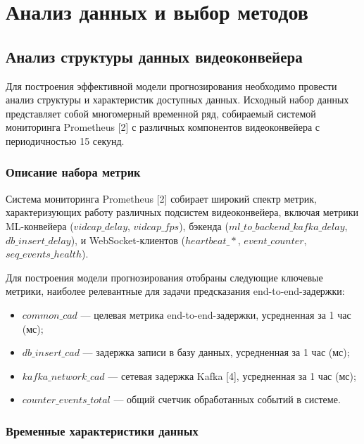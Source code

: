 \chapter{Анализ данных и выбор методов}

\section{Анализ структуры данных видеоконвейера}

\hspace*{1.25cm}Для построения эффективной модели прогнозирования необходимо провести анализ структуры и характеристик доступных данных. Исходный набор данных представляет собой многомерный временной ряд, собираемый системой мониторинга Prometheus [2] с различных компонентов видеоконвейера с периодичностью 15 секунд.

\subsection{Описание набора метрик}

\hspace*{1.25cm}Система мониторинга Prometheus [2] собирает широкий спектр метрик, характеризующих работу различных подсистем видеоконвейера, включая метрики ML-конвейера ($vidcap\_delay$, $vidcap\_fps$), бэкенда ($ml\_to\_backend\_kafka\_delay$, $db\_insert\_delay$), и WebSocket-клиентов ($heartbeat\_*$, $event\_counter$, $seq\_events\_health$).

\hspace*{1.25cm}Для построения модели прогнозирования отобраны следующие ключевые метрики, наиболее релевантные для задачи предсказания end-to-end-задержки:

\begin{itemize}
	\item $common\_cad$ --- целевая метрика end-to-end-задержки, усредненная за 1 час (мс);
	\item $db\_insert\_cad$ --- задержка записи в базу данных, усредненная за 1 час (мс);
	\item $kafka\_network\_cad$ --- сетевая задержка Kafka [4], усредненная за 1 час (мс);
	\item $counter\_events\_total$ --- общий счетчик обработанных событий в системе.
\end{itemize}

\subsection{Временные характеристики данных}

